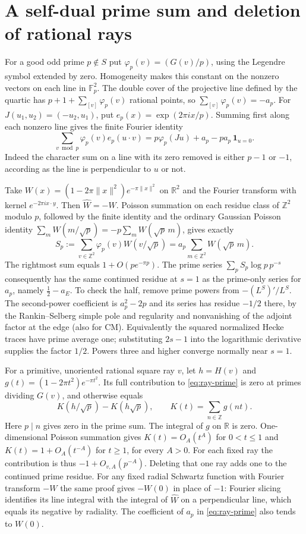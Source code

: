 \documentclass[11pt]{article}
\newcommand{\R}{\mathbb{R}}
\newcommand{\Z}{\mathbb{Z}}
\newcommand{\F}{\mathbb{F}}
\begin{document}
\section{A self-dual prime sum and deletion of rational rays}\label{sec:ray-deletion}

For a good odd prime $p\notin S$ put $\varphi_p(v)=(G(v)/p)$, using the
Legendre symbol extended by zero. Homogeneity makes this constant on the
nonzero vectors on each line in $\F_p^2$. The double cover of the
projective line defined by the quartic has $p+1+\sum_{[v]}\varphi_p(v)$
rational points, so $\sum_{[v]}\varphi_p(v)=-a_p$. For
$J(u_1,u_2)=(-u_2,u_1)$, put $e_p(x)=\exp(2\pi ix/p)$. Summing first
along each nonzero line gives the finite Fourier identity
\[
 \sum_{v\bmod p}\varphi_p(v)e_p(u\cdot v)
 =p\varphi_p(Ju)+a_p-p a_p\,\mathbf 1_{u=0}.
\]
Indeed the character sum on a line with its zero removed is either
$p-1$ or $-1$, according as the line is perpendicular to $u$ or not.

Take $W(x)=(1-2\pi\|x\|^2)e^{-\pi\|x\|^2}$ on $\R^2$ and the Fourier
transform with kernel $e^{-2\pi i x\cdot y}$. Then $\widehat W=-W$.
Poisson summation on each residue class of $\Z^2$ modulo $p$, followed
by the finite identity and the ordinary Gaussian Poisson identity
$\sum_m W(m/\sqrt p)=-p\sum_m W(\sqrt p\,m)$, gives exactly
\begin{equation}\label{eq:ray-prime}
 S_p:=\sum_{v\in\Z^2}\varphi_p(v)W(v/\sqrt p)
       =a_p\sum_{m\in\Z^2}W(\sqrt p\,m).
\end{equation}
The rightmost sum equals $1+O(p e^{-\pi p})$. The prime series
$\sum_p S_p\log p\, p^{-s}$ consequently has the same continued
residue at $s=1$ as the prime-only series for $a_p$, namely
$\tfrac12-a_E$. To check the half, remove prime powers from
$-(L^S)'/L^S$. The second-power coefficient is $a_p^2-2p$ and its
series has residue $-1/2$ there, by the Rankin--Selberg simple pole
and regularity and nonvanishing of the adjoint factor at the edge (also for CM). Equivalently the squared normalized Hecke traces have prime average one; substituting $2s-1$ into the logarithmic derivative supplies the factor $1/2$.
Powers three and higher converge normally near $s=1$.

For a primitive, unoriented rational square ray $v$, let $h=H(v)$ and
$g(t)=(1-2\pi t^2)e^{-\pi t^2}$. Its full contribution to
\eqref{eq:ray-prime} is zero at primes dividing $G(v)$, and otherwise
equals
\begin{equation}\label{eq:ray-line}
 K(h/\sqrt p)-K(h\sqrt p),\qquad K(t)=\sum_{n\in\Z}g(nt).
\end{equation}
Here $p\mid n$ gives zero in the prime sum. The integral of $g$ on
$\R$ is zero. One-dimensional Poisson summation gives $K(t)=O_A(t^A)$
for $0<t\le1$ and $K(t)=1+O_A(t^{-A})$ for $t\ge1$, for every $A>0$.
For each fixed ray the contribution is thus $-1+O_{v,A}(p^{-A})$.
Deleting that one ray adds one to the continued prime residue. For
any fixed radial Schwartz function with Fourier transform $-W$ the
same proof gives $-W(0)$ in place of $-1$: Fourier slicing identifies
its line integral with the integral of $\widehat W$ on a perpendicular
line, which equals its negative by radiality. The coefficient of
$a_p$ in \eqref{eq:ray-prime} also tends to $W(0)$.
\end{document}
